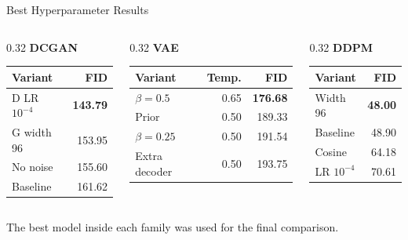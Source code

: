 \documentclass[aspectratio=169]{beamer}
\begin{document}
\begin{frame}{Best Hyperparameter Results}
  \scriptsize
  \begin{columns}[T]
    \begin{column}{0.32\linewidth}
      \centering
      \textbf{DCGAN}\\[0.1cm]
      \begin{tabular}{lr}
        \toprule
        Variant & FID \\
        \midrule
        D LR $10^{-4}$ & \textbf{143.79} \\
        G width 96 & 153.95 \\
        No noise & 155.60 \\
        Baseline & 161.62 \\
        \bottomrule
      \end{tabular}
    \end{column}
    \begin{column}{0.32\linewidth}
      \centering
      \textbf{VAE}\\[0.1cm]
      \begin{tabular}{lrr}
        \toprule
        Variant & Temp. & FID \\
        \midrule
        $\beta=0.5$ & 0.65 & \textbf{176.68} \\
        Prior & 0.50 & 189.33 \\
        $\beta=0.25$ & 0.50 & 191.54 \\
        Extra decoder & 0.50 & 193.75 \\
        \bottomrule
      \end{tabular}
    \end{column}
    \begin{column}{0.32\linewidth}
      \centering
      \textbf{DDPM}\\[0.1cm]
      \begin{tabular}{lr}
        \toprule
        Variant & FID \\
        \midrule
        Width 96 & \textbf{48.00} \\
        Baseline & 48.90 \\
        Cosine & 64.18 \\
        LR $10^{-4}$ & 70.61 \\
        \bottomrule
      \end{tabular}
    \end{column}
  \end{columns}

  \vspace{0.35cm}
  \small
  The best model inside each family was used for the final comparison.
\end{frame}
\end{document}
